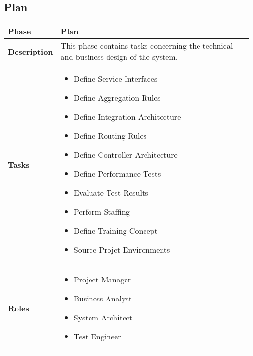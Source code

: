 \subsection{Plan}
	\begin{tabularx}{\textwidth}{@{} l X @{}}
		\caption{Phase: Plan}\label{table:ch6_View_Plan}\\
		\toprule
		\bfseries Phase & Plan\\
		\midrule 
		\bfseries Description & This phase contains tasks concerning the technical and business design of the system.\\
		\midrule
		\bfseries Tasks & \begin{itemize}
			\item Define Service Interfaces
			\item Define Aggregation Rules
			\item Define Integration Architecture
			\item Define Routing Rules
			\item Define Controller Architecture
			\item Define Performance Tests
			\item Evaluate Test Results
			\item Perform Staffing
			\item Define Training Concept
			\item Source Projct Environments
		\end{itemize}\\
		\midrule
		\bfseries Roles & \begin{itemize}
			\item Project Manager
			\item Business Analyst
			\item System Architect
			\item Test Engineer
		\end{itemize}\\
		\bottomrule
	\end{tabularx}
	
